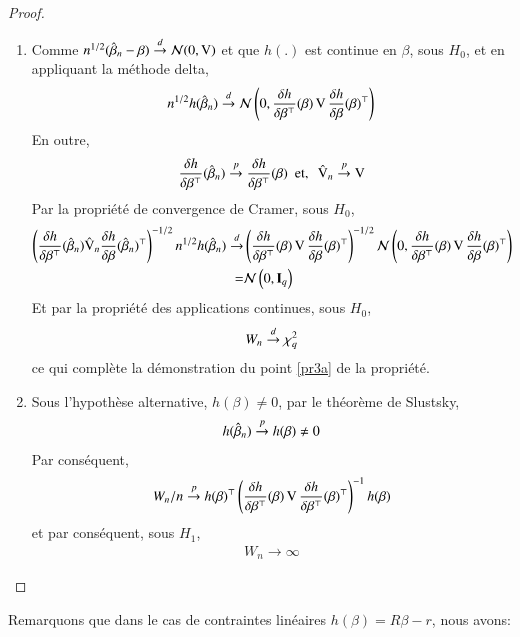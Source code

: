 \documentclass[10pt, reqno]{amsart}
\begin{document}
\begin{proof} 
\begin{enumerate}
\item Comme $n^{1/2}(\hat{\beta}_n- \beta) \overset{d}{\rightarrow} \mathcal{N}(0, \operatorname{V})$ et que $h(.)$ est continue en $\beta$, sous $H_0$, et en appliquant la méthode delta,
\begin{align*}
n^{1/2}h(\hat{\beta}_n) \overset{d}{\rightarrow} \mathcal{N}\left(0, \frac{\delta h}{\delta \beta^\top}(\beta) \operatorname{V} \frac{\delta h}{\delta \beta}(\beta)^\top \right)
\end{align*}
En outre,
\begin{align*}
\frac{\delta h}{\delta \beta^\top}(\hat{\beta}_n) \overset{p}{\rightarrow} \frac{\delta h}{\delta \beta^\top}(\beta) \ \ \textrm{et}, \ \ \hat{\operatorname{V}}_n \overset{p}{\rightarrow} \operatorname{V}
\end{align*}
Par la propriété de convergence de Cramer, sous $H_0$,
\begin{align*}
\left(\frac{\delta h}{\delta \beta ^ \top}(\hat{\beta}_n)\hat{\operatorname{V}}_n \frac{\delta h}{\delta \beta}(\hat{\beta}_n)^\top \right)^{-1/2}n^{1/2} h(\hat{\beta}_n) 
\overset{d}{\rightarrow} & \left(\frac{\delta h}{\delta \beta^\top}(\beta) \operatorname{V} \frac{\delta h}{\delta \beta}(\beta)^\top\right)^{-1/2} \mathcal{N}\left(0, \frac{\delta h}{\delta \beta^\top}(\beta) \operatorname{V} \frac{\delta h}{\delta \beta}(\beta)^\top\right)\\
= & \mathcal{N}\left(0, \mathbf{I}_q \right)
\end{align*}
Et par la propriété des applications continues, sous $H_0$,
\begin{align*}
W_n \overset{d}{\rightarrow} \chi^2_q
\end{align*}
ce qui complète la démonstration du point \ref{pr3a} de la propriété.
\item Sous l'hypothèse alternative, $h(\beta)\neq 0$, par le théorème de Slustsky,
\begin{align*}
h(\hat{\beta}_n)\overset{p}{\rightarrow} h(\beta) \neq 0
\end{align*}
Par conséquent, 
\begin{align*}
W_n /n \overset{p}{\rightarrow} h(\beta)^\top\left(\frac{\delta h}{\delta \beta^\top}(\beta) \operatorname{V} \frac{\delta h}{\delta \beta^\top}(\beta)^\top \right)^{-1} h(\beta)
\end{align*}
et par conséquent, sous $H_1$, 
\begin{align*}
W_n \rightarrow \infty
\end{align*}
\end{enumerate}
\end{proof}
Remarquons que dans le cas de contraintes linéaires $h(\beta) = R\beta - r$, nous avons:
\end{document}
